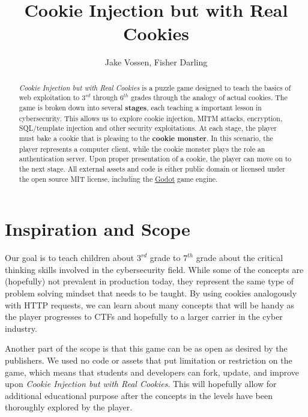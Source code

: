 \documentclass{article}
\begin{document}
\title{Cookie Injection but with Real Cookies}
\author{Jake Vossen, Fisher Darling}

\maketitle

\begin{abstract}
  
\textit{Cookie Injection but with Real Cookies} is a puzzle game
designed to teach the basics of web exploitation to $3^{rd}$ through
$6^{th}$ grades through the analogy of actual cookies. The game is
broken down into several \textbf{stages}, each teaching a important
lesson in cybersecurity. This allows us to explore cookie injection,
MITM attacks, encryption, SQL/template injection and other security
exploitations. At each stage, the player must bake a cookie that is
pleasing to the \textbf{cookie monster}. In this scenario, the player
represents a computer client, while the cookie monster plays the role
an authentication server. Upon proper presentation of a cookie, the
player can move on to the next stage. All external assets and code is
either public domain or licensed under the open source MIT
license, including the \href{https://godotengine.org}{Godot} game
engine.



\end{abstract}

\section{Inspiration and Scope}

Our goal is to teach children about $3^{rd}$ grade to $7^{th}$ grade
about the critical thinking skills involved in the cybersecurity
field. While some of the concepts are (hopefully) not prevalent in
production today, they represent the same type of problem solving
mindset that needs to be taught. By using cookies analogously with
HTTP requests, we can learn about many concepts that will be handy as
the player progresses to CTFs and hopefully to a larger carrier in the
cyber industry.

Another part of the scope is that this game can be as open as desired
by the publishers. We used no code or assets that put limitation or
restriction on the game, which means that students and developers can
fork, update, and improve upon \textit{Cookie Injection but with Real
Cookies}. This will hopefully allow for additional educational purpose
after the concepts in the levels have been thoroughly explored by the
player.
\end{document}
